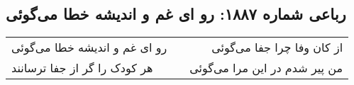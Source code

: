 \begin{center}
\section*{رباعی شماره ۱۸۸۷: رو ای غم و اندیشه خطا می‌گوئی}
\label{sec:1887}
\begin{longtable}{l p{0.5cm} r}
رو ای غم و اندیشه خطا می‌گوئی
&&
از کان وفا چرا جفا می‌گوئی
\\
هر کودک را گر از جفا ترسانند
&&
من پیر شدم در این مرا می‌گوئی
\\
\end{longtable}
\end{center}
